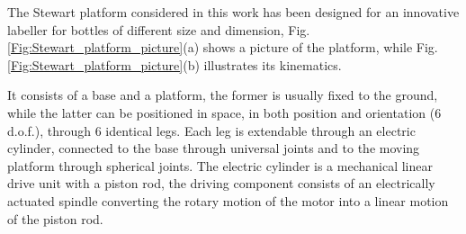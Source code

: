 \documentclass[]{interact}
\theoremstyle{plain}%
\theoremstyle{definition}
\theoremstyle{remark}
\begin{document}
The Stewart platform considered in this work has been designed for an innovative labeller for bottles of different size and dimension, Fig. \ref{Fig:Stewart_platform_picture}(a) shows a picture of the platform, while Fig. \ref{Fig:Stewart_platform_picture}(b) illustrates its kinematics.

It consists of a base and a platform, the former is usually fixed to the ground, while the latter can be positioned in space, in both position and orientation (6 d.o.f.), through 6 identical legs. Each leg is extendable through an electric cylinder, connected to the base through universal joints and to the moving platform through spherical joints. The electric cylinder is a mechanical linear drive unit with a piston rod, the driving component consists of an electrically actuated spindle converting the rotary motion of the motor into a linear motion of the piston rod.
\end{document}
